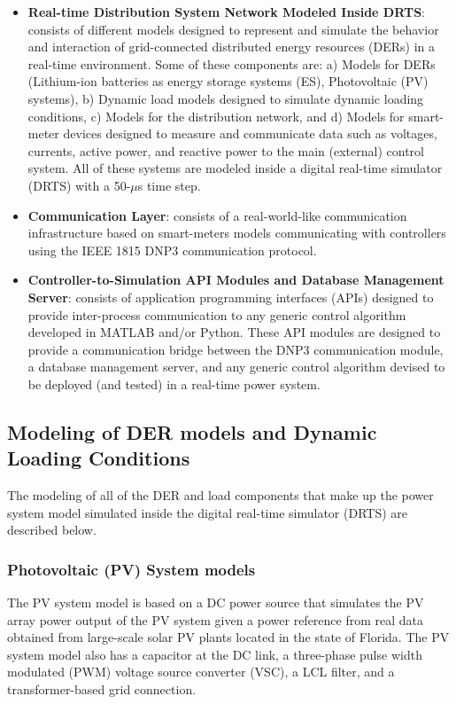 \begin{itemize}
    \item \textbf{Real-time Distribution System Network Modeled Inside DRTS}: consists of different models designed to represent and simulate the behavior and interaction of grid-connected distributed energy resources (DERs) in a real-time environment. Some of these components are: a) Models for DERs (Lithium-ion batteries as energy storage systems (ES), Photovoltaic (PV) systems), b) Dynamic load models designed to simulate dynamic loading conditions,  c) Models for the distribution network, and d) Models for smart-meter devices designed to measure and communicate data such as voltages, currents, active power, and reactive power to the main (external) control system. All of these systems are modeled inside a digital real-time simulator (DRTS) with a 50-$\mu$s time step.
    
    
    \item \textbf{Communication Layer}: consists of a real-world-like communication infrastructure based on smart-meters models communicating with controllers using the IEEE 1815 DNP3 communication protocol. 
    
    
    \item \textbf{Controller-to-Simulation API Modules and Database Management Server}: consists of application programming interfaces (APIs) designed to provide inter-process communication to any generic control algorithm developed in MATLAB and/or Python. These API modules are designed to provide a communication bridge between the DNP3 communication module, a database management server, and any generic control algorithm devised to be deployed (and tested) in a real-time power system.
\end{itemize}



\subsection{Modeling of DER models and Dynamic Loading Conditions}
The modeling of all of the DER and load components that make up the power system model simulated inside the digital real-time simulator (DRTS) are described below.

\subsubsection{Photovoltaic (PV) System models}
The PV system model is based on a DC power source that simulates the PV array power output of the PV system given a power reference from real data obtained from large-scale solar PV plants located in the state of Florida. The PV system model also has a capacitor at the DC link, a three-phase pulse width modulated (PWM) voltage source converter (VSC), a LCL filter, and a transformer-based grid connection.


